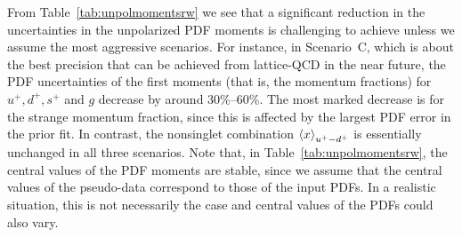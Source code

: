From Table~\ref{tab:unpolmomentsrw} we see that a significant
reduction in the uncertainties in the unpolarized PDF moments is challenging 
to achieve unless we assume the most aggressive scenarios.
%
For instance, in Scenario~C, which is about the best precision that
can be achieved from lattice-QCD in the near future, the PDF uncertainties 
of the first moments (that is, the momentum fractions) for $u^+,d^+,s^+$ and 
$g$ decrease by around 30\%--60\%.
%
The most marked decrease is for the strange momentum fraction, since this is 
affected by the largest PDF error in the prior fit.
%
In contrast, the nonsinglet combination $\left\langle x\right\rangle_{u^+-d^+}$ is essentially
unchanged in all three scenarios.
%
Note that, in Table~\ref{tab:unpolmomentsrw}, the central values of the PDF 
moments are stable, since we assume that the central values of the 
pseudo-data correspond to those of the input PDFs. 
%
In a realistic situation, this is not necessarily the case and 
central values of the PDFs could also vary.

